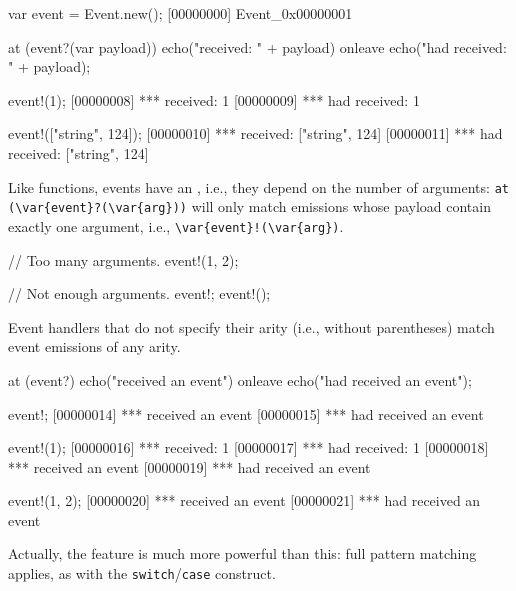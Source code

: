 \begin{urbiscript}[firstnumber=1]
var event = Event.new();
[00000000] Event_0x00000001

at (event?(var payload))
  echo("received: " + payload)
onleave
  echo("had received: " + payload);

event!(1);
[00000008] *** received: 1
[00000009] *** had received: 1

event!(["string", 124]);
[00000010] *** received: ["string", 124]
[00000011] *** had received: ["string", 124]
\end{urbiscript}

Like functions, events have an , i.e., they depend on the number
of arguments: \lstinline|at (\var{event}?(\var{arg}))| will only match
emissions whose payload contain exactly one argument, i.e.,
\lstinline|\var{event}!(\var{arg})|.

\begin{urbiscript}
// Too many arguments.
event!(1, 2);

// Not enough arguments.
event!;
event!();
\end{urbiscript}

Event handlers that do not specify their arity (i.e., without parentheses)
match event emissions of any arity.

\begin{urbiscript}
at (event?)
  echo("received an event")
onleave
  echo("had received an event");

event!;
[00000014] *** received an event
[00000015] *** had received an event

event!(1);
[00000016] *** received: 1
[00000017] *** had received: 1
[00000018] *** received an event
[00000019] *** had received an event

event!(1, 2);
[00000020] *** received an event
[00000021] *** had received an event
\end{urbiscript}

Actually, the feature is much more powerful than this: full pattern matching
applies, as with the \lstinline|switch|/\lstinline|case| construct.

